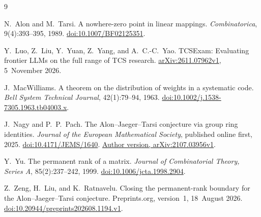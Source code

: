 \begin{thebibliography}{9}

N.~Alon and M.~Tarsi.
\newblock A nowhere-zero point in linear mappings.
\newblock \emph{Combinatorica}, 9(4):393--395, 1989.
\newblock \href{https://doi.org/10.1007/BF02125351}{doi:10.1007/BF02125351}.

Y.~Luo, Z.~Liu, Y.~Yuan, Z.~Yang, and A.~C.-C.~Yao.
\newblock TCSExam: Evaluating frontier LLMs on the full range of TCS research.
\newblock \href{https://arxiv.org/abs/2611.07962v1}{arXiv:2611.07962v1}, 5~November 2026.

J.~MacWilliams.
\newblock A theorem on the distribution of weights in a systematic code.
\newblock \emph{Bell System Technical Journal}, 42(1):79--94, 1963.
\newblock \href{https://doi.org/10.1002/j.1538-7305.1963.tb04003.x}{doi:10.1002/j.1538-7305.1963.tb04003.x}.

J.~Nagy and P.~P.~Pach.
\newblock The Alon--Jaeger--Tarsi conjecture via group ring identities.
\newblock \emph{Journal of the European Mathematical Society}, published online first, 2025.
\newblock \href{https://doi.org/10.4171/JEMS/1640}{doi:10.4171/JEMS/1640}. \href{https://arxiv.org/abs/2107.03956v1}{Author version, arXiv:2107.03956v1}.

Y.~Yu.
\newblock The permanent rank of a matrix.
\newblock \emph{Journal of Combinatorial Theory, Series A}, 85(2):237--242, 1999.
\newblock \href{https://doi.org/10.1006/jcta.1998.2904}{doi:10.1006/jcta.1998.2904}.

Z.~Zeng, H.~Liu, and K.~Ratnavelu.
\newblock Closing the permanent-rank boundary for the Alon--Jaeger--Tarsi conjecture.
\newblock Preprints.org, version~1, 18~August 2026.
\newblock \href{https://doi.org/10.20944/preprints202608.1194.v1}{doi:10.20944/preprints202608.1194.v1}.

\end{thebibliography}

